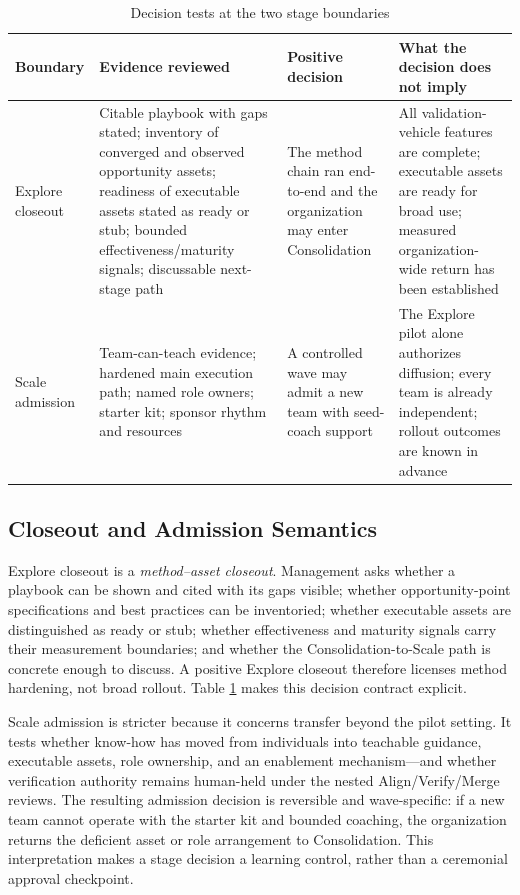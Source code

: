 \documentclass[10pt,conference]{IEEEtran}
\begin{document}
\begin{table}[t]
\caption{Decision tests at the two stage boundaries}
\label{tab:stage-criteria}
\centering
\footnotesize
\begin{tabularx}{\textwidth}{@{}p{}X X X@{}}
\toprule
\textbf{Boundary} & \textbf{Evidence reviewed} &
\textbf{Positive decision} & \textbf{What the decision does not imply} \\
\midrule
Explore closeout &
Citable playbook with gaps stated; inventory of converged and observed
opportunity assets; readiness of executable assets stated as ready or stub;
bounded effectiveness/maturity signals; discussable next-stage path &
The method chain ran end-to-end and the organization may enter
Consolidation &
All validation-vehicle features are complete; executable assets are ready
for broad use; measured organization-wide return has been established \\
\addlinespace
Scale admission &
Team-can-teach evidence; hardened main execution path; named role owners;
starter kit; sponsor rhythm and resources &
A controlled wave may admit a new team with seed-coach support &
The Explore pilot alone authorizes diffusion; every team is already
independent; rollout outcomes are known in advance \\
\bottomrule
\end{tabularx}
\end{table}

\subsection{Closeout and Admission Semantics}

Explore closeout is a \emph{method--asset closeout}.  Management asks whether a playbook can be
shown and cited with its gaps visible; whether opportunity-point
specifications and best practices can be inventoried; whether executable
assets are distinguished as ready or stub; whether effectiveness
and maturity signals carry their measurement boundaries; and whether the
Consolidation-to-Scale path is concrete enough to discuss.  A positive Explore closeout
therefore licenses method hardening, not broad rollout.  Table
\ref{tab:stage-criteria} makes this decision contract explicit.

Scale admission is stricter because it concerns transfer beyond the pilot setting.  It
tests whether know-how has moved from individuals into teachable guidance,
executable assets, role ownership, and an enablement mechanism---and whether
verification authority remains human-held under the nested Align/Verify/Merge reviews.
The resulting admission decision is reversible and wave-specific: if a new
team cannot operate with the starter kit and bounded coaching, the
organization returns the deficient asset or role arrangement to
Consolidation.
This interpretation makes a stage decision a learning control, rather than a ceremonial
approval checkpoint.
\end{document}
